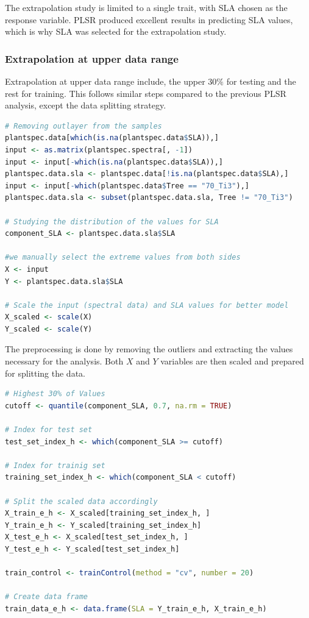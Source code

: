 \documentclass[12pt,a4paper]{report}
\begin{document}
The extrapolation study is limited to a single trait, with SLA chosen as the response variable. PLSR produced excellent results in predicting SLA values, which is why SLA was selected for the extrapolation study.

\subsubsection*{Extrapolation at upper data range}
Extrapolation at upper data range include, the upper $30\%$ for testing and the rest for training. This follows similar steps compared to the previous PLSR analysis, except the data splitting strategy.\\ 

\begin{lstlisting}[language=R, style=mystyle]
# Removing outlayer from the samples
plantspec.data[which(is.na(plantspec.data$SLA)),]
input <- as.matrix(plantspec.spectra[, -1])
input <- input[-which(is.na(plantspec.data$SLA)),]
plantspec.data.sla <- plantspec.data[!is.na(plantspec.data$SLA),]
input <- input[-which(plantspec.data$Tree == "70_Ti3"),]
plantspec.data.sla <- subset(plantspec.data.sla, Tree != "70_Ti3")

# Studying the distribution of the values for SLA
component_SLA <- plantspec.data.sla$SLA

#we manually select the extreme values from both sides
X <- input  
Y <- plantspec.data.sla$SLA  

# Scale the input (spectral data) and SLA values for better model
X_scaled <- scale(X)            
Y_scaled <- scale(Y)
\end{lstlisting}

The preprocessing is done by removing the outliers and extracting the values necessary for the analysis. Both $X$ and $Y$ variables are then scaled and prepared for splitting the data. \\

\begin{lstlisting}[language=R, style=mystyle]
# Highest 30% of Values
cutoff <- quantile(component_SLA, 0.7, na.rm = TRUE)

# Index for test set
test_set_index_h <- which(component_SLA >= cutoff)

# Index for trainig set
training_set_index_h <- which(component_SLA < cutoff)

# Split the scaled data accordingly
X_train_e_h <- X_scaled[training_set_index_h, ]
Y_train_e_h <- Y_scaled[training_set_index_h]
X_test_e_h <- X_scaled[test_set_index_h, ]
Y_test_e_h <- Y_scaled[test_set_index_h]

train_control <- trainControl(method = "cv", number = 20)

# Create data frame 
train_data_e_h <- data.frame(SLA = Y_train_e_h, X_train_e_h)
\end{lstlisting}
\end{document}
